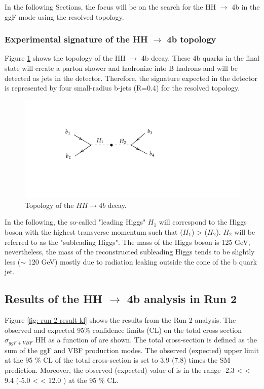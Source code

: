 In the following Sections, the focus will be on the search for the HH $\to$ 4b in the ggF mode using the resolved topology.

\newpage

\subsubsection{Experimental signature of the HH $\to$ 4b topology} \label{subsection: topology}
Figure \ref{fig: topology} shows the topology of the HH $\to$ 4b decay. These 4b quarks in the final state will create a parton shower and hadronize into B hadrons and will be detected as jets in the detector. Therefore, the signature expected in the detector is represented by four small-radius b-jets (R=0.4) for the resolved topology.
\begin{figure}[hbt]
    \centering
    \includegraphics[width=0.5\linewidth]{Images/4.HH4b Analysis/Higgs intro/topology di-higgs.pdf}
    \caption{Topology of the $HH \to 4b$ decay.}
    \label{fig: topology}
\end{figure}

In the following, the so-called "leading Higgs" $H_1$ will correspond to the Higgs boson with the highest transverse momentum such that \pt($H_1$) > \pt($H_2$). $H_2$ will be referred to as the "subleading Higgs". The mass of the Higgs boson is 125 GeV, nevertheless, the mass of the reconstructed subleading Higgs tends to be slightly less ($\sim$ 120 GeV) mostly due to radiation leaking outside the cone of the b quark jet. 

\subsection{Results of the HH $\to$ 4b analysis in Run 2}

Figure \ref{fig: run 2 result kl} shows the results from the Run 2 analysis. The observed and expected 95\% confidence limits (CL) on the total cross section $\sigma_{ggF+VBF}$ HH as a function of \kl are shown. The total cross-section is defined as the sum of the ggF and VBF production modes. The observed (expected) upper limit at the 95 \% CL of the total cross-section is set to 3.9 (7.8) times the SM prediction. Moreover, the observed (expected) value of \kl is in the range -2.3 < \kl < 9.4 (-5.0 < \kl < 12.0 ) at the 95 \% CL. \cite{Run2res}

